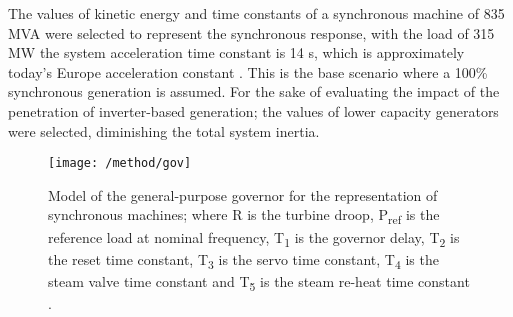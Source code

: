 The values of kinetic energy and time constants of a synchronous machine of 835 MVA were selected to represent the synchronous response, with the load of 315 MW the system acceleration time constant is 14 s, which is approximately today’s Europe acceleration constant \cite{ENTSOE.2016}. This is the base scenario where a 100\% synchronous generation is assumed. For the sake of evaluating the impact of the penetration of inverter-based generation; the values of lower capacity generators were selected, diminishing the total system inertia.\\
\begin{figure}[h]
\centering
\texttt{[image: /method/gov]}
\caption{Model of the general-purpose governor for the representation of synchronous machines; where R is the turbine droop, P\textsubscript{ref} is the reference load at nominal frequency, T\textsubscript{1} is the governor delay, T\textsubscript{2} is the reset time constant, T\textsubscript{3} is the servo time constant, T\textsubscript{4} is the steam valve time constant and T\textsubscript{5} is the steam re-heat time constant \cite{Anderson.2002}.}
\label{fig:gov}
\end{figure}

